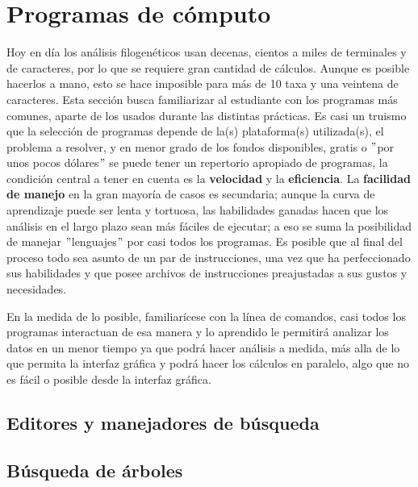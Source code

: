 \chapter{Programas de c\'omputo}
\label{ch:programas}

Hoy en d\'ia los an\'alisis filogen\'eticos usan decenas, cientos a miles de terminales y de caracteres, por lo que se requiere gran  cantidad de c\'alculos. Aunque es posible hacerlos a mano, esto se 
hace imposible para m\'as de 10 taxa y una veintena de caracteres. 
Esta secci\'on busca familiarizar al estudiante con los programas 
m\'as comunes, aparte de los usados durante las distintas pr\'acticas. 
Es casi un truismo que la selecci\'on de programas depende de la(s) 
plataforma(s) utilizada(s), el problema a resolver, y en menor grado 
de los fondos disponibles, gratis o $"$por unos pocos d\'olares$"$ se 
puede tener un repertorio apropiado de programas, la condici\'on 
central a tener en cuenta es la \textbf{velocidad} y la \textbf{eficiencia}. 
La \textbf{facilidad de manejo} en la gran mayor\'ia de casos es secundaria; 
aunque la curva de aprendizaje puede ser lenta y tortuosa, las 
habilidades ganadas hacen que los an\'alisis en el largo plazo sean 
m\'as f\'aciles de ejecutar; a eso se suma la posibilidad de manejar 
$"$lenguajes$"$ por casi todos los programas. Es posible que al final 
del proceso todo sea asunto de un par de instrucciones, una vez 
que ha perfeccionado sus habilidades y que posee archivos de 
instrucciones preajustadas a sus gustos y necesidades. 

En la medida de lo posible, familiar\'icese con la l\'inea de comandos, casi todos los programas interactuan de esa manera y lo aprendido le permitir\'a analizar los datos en un menor tiempo ya que podr\'a hacer an\'alisis a medida, m\'as alla de lo que permita la interfaz gr\'afica y podr\'a hacer los c\'alculos en paralelo, algo que no es f\'acil o posible desde la interfaz gr\'afica.

\newpage

\section{Editores y manejadores de b\'usqueda}


\section{B\'usqueda de \'arboles}





%
%
%


